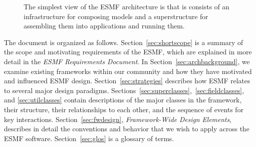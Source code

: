 \begin{figure}
\label{fig:sandwich}
\caption[{ESMF Architecture}]{The simplest view of the ESMF architecture
is that is consists of an infrastructure for composing models and a 
superstructure for assembling them into applications and running them.}
\end{figure}

The document is organized as follows.  Section~\ref{sec:shortscope} is a summary of the 
scope and motivating requirements of the ESMF, which are explained in more detail in 
the {\it ESMF Requirements Document}.  In Section~\ref{sec:archbackground}, 
we examine existing frameworks within our community and how they have motivated
and influenced ESMF design.  
Section~\ref{sec:strategies} describes how ESMF relates to several
major design paradigms.
Sections~\ref{sec:superclasses},~\ref{sec:fieldclasses}, and
\ref{sec:utilclasses} contain descriptions of the 
major classes in the framework, their structure, their relationships to each other, 
and the sequence of events for key interactions.  Section~\ref{sec:fwdesign}, {\it 
Framework-Wide Design Elements}, describes in detail the conventions and behavior
that we wish to apply across the ESMF software.  Section~\ref{sec:glos} is a 
glossary of terms.








